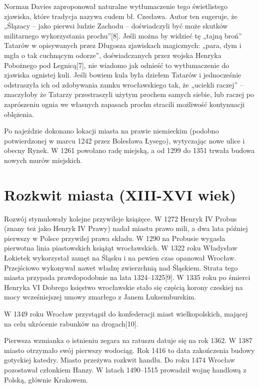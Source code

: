 \documentclass{article}
\begin{document}
Norman Davies zaproponował naturalne wytłumaczenie tego świetlistego zjawiska, które tradycja nazywa cudem bł. Czesława. Autor ten sugeruje, że „Ślązacy – jako pierwsi ludzie Zachodu – doświadczyli być może skutków militarnego wykorzystania prochu”[8]. Jeśli można by widzieć tę „tajną broń” Tatarów w opisywanych przez Długosza zjawiskach magicznych: „para, dym i mgła o tak cuchnącym odorze”, doświadczanych przez wojska Henryka Pobożnego pod Legnicą[7], nie wiadomo jak odnieść to wytłumaczenie do zjawiska ognistej kuli. Jeśli bowiem kula była dziełem Tatarów i jednocześnie odstraszyła ich od zdobywania zamku wrocławskiego tak, że „uciekli raczej” – znaczyłoby że Tatarzy przestraszyli użytym prochem samych siebie, lub raczej po zaprószeniu ognia we własnych zapasach prochu stracili możliwość kontynuacji oblężenia.

Po najeździe dokonano lokacji miasta na prawie niemieckim (podobno potwierdzonej w marcu 1242 przez Bolesława Łysego), wytyczając nowe ulice i obecny Rynek. W 1261 powołano radę miejską, a od 1299 do 1351 trwała budowa nowych murów miejskich.

\section{Rozkwit miasta (XIII-XVI wiek)}
\hrulefill

Rozwój stymulowały kolejne przywileje książęce. W 1272 Henryk IV Probus (znany też jako Henryk IV Prawy) nadał miastu prawo mili, a dwa lata później pierwszy w Polsce przywilej prawa składu. W 1290 na Probusie wygasła pierwotna linia piastowskich książąt wrocławskich. W 1322 roku Władysław Łokietek wykorzystał zamęt na Śląsku i na pewien czas opanował Wrocław. Przejściowo wykonywał nawet władzę zwierzchnią nad Śląskiem. Strata tego miasta przypada prawdopodobnie na lata 1324–1325[9]. W 1335 roku po śmierci Henryka VI Dobrego księstwo wrocławskie stało się częścią korony czeskiej na mocy wcześniejszej umowy zmarłego z Janem Luksemburskim.

W 1349 roku Wrocław przystąpił do konfederacji miast wielkopolskich, mającej na celu ukrócenie rabunków na drogach[10].

Pierwsza wzmianka o istnieniu zegara na ratuszu datuje się na rok 1362. W 1387 miasto otrzymało swój pierwszy wodociąg. Rok 1416 to data zakończenia budowy gotyckiej katedry. Miasto przeżywa rozkwit handlu. Do roku 1474 Wrocław pozostawał członkiem Hanzy. W latach 1490–1515 prowadził wojnę handlową z Polską, głównie Krakowem.
\end{document}
